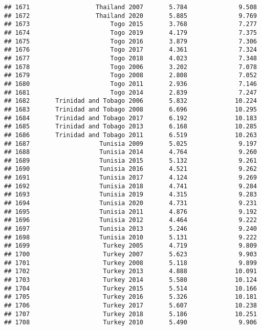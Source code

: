 \documentclass[
]{article}
\begin{document}
\begin{verbatim}
## 1671                  Thailand 2007       5.784              9.508
## 1672                  Thailand 2020       5.885              9.769
## 1673                      Togo 2015       3.768              7.277
## 1674                      Togo 2019       4.179              7.375
## 1675                      Togo 2016       3.879              7.306
## 1676                      Togo 2017       4.361              7.324
## 1677                      Togo 2018       4.023              7.348
## 1678                      Togo 2006       3.202              7.078
## 1679                      Togo 2008       2.808              7.052
## 1680                      Togo 2011       2.936              7.146
## 1681                      Togo 2014       2.839              7.247
## 1682       Trinidad and Tobago 2006       5.832             10.224
## 1683       Trinidad and Tobago 2008       6.696             10.295
## 1684       Trinidad and Tobago 2017       6.192             10.183
## 1685       Trinidad and Tobago 2013       6.168             10.285
## 1686       Trinidad and Tobago 2011       6.519             10.263
## 1687                   Tunisia 2009       5.025              9.197
## 1688                   Tunisia 2014       4.764              9.260
## 1689                   Tunisia 2015       5.132              9.261
## 1690                   Tunisia 2016       4.521              9.262
## 1691                   Tunisia 2017       4.124              9.269
## 1692                   Tunisia 2018       4.741              9.284
## 1693                   Tunisia 2019       4.315              9.283
## 1694                   Tunisia 2020       4.731              9.231
## 1695                   Tunisia 2011       4.876              9.192
## 1696                   Tunisia 2012       4.464              9.222
## 1697                   Tunisia 2013       5.246              9.240
## 1698                   Tunisia 2010       5.131              9.222
## 1699                    Turkey 2005       4.719              9.809
## 1700                    Turkey 2007       5.623              9.903
## 1701                    Turkey 2008       5.118              9.899
## 1702                    Turkey 2013       4.888             10.091
## 1703                    Turkey 2014       5.580             10.124
## 1704                    Turkey 2015       5.514             10.166
## 1705                    Turkey 2016       5.326             10.181
## 1706                    Turkey 2017       5.607             10.238
## 1707                    Turkey 2018       5.186             10.251
## 1708                    Turkey 2010       5.490              9.906

\end{verbatim}
\end{document}
